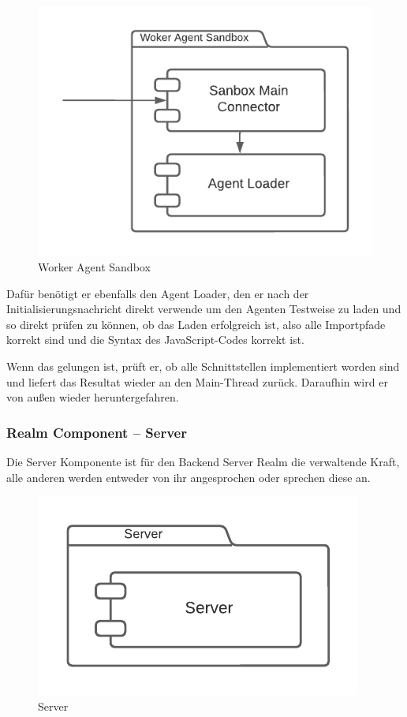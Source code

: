 \begin{figure}[htb]
    \centering
    \includegraphics[scale=.65,center]{medien/worker-agent-sandbox.pdf}
    \caption{Worker Agent Sandbox}
    \ownsource
    \label{fig:worker-agent-sandbox}
\end{figure}

\FloatBarrier

Dafür benötigt er ebenfalls den Agent Loader, den er nach der Initialisierungsnachricht direkt verwende um den Agenten Testweise zu laden und so direkt prüfen zu können, ob das Laden erfolgreich ist, also alle Importpfade korrekt sind und die Syntax des JavaScript-Codes korrekt ist.

Wenn das gelungen ist, prüft er, ob alle Schnittstellen implementiert worden sind und liefert das Resultat wieder an den Main-Thread zurück.
Daraufhin wird er von außen wieder heruntergefahren.

\subsubsection{Realm Component – Server}

Die Server Komponente ist für den Backend Server Realm die verwaltende Kraft, alle anderen werden entweder von ihr angesprochen oder sprechen diese an.

\begin{figure}[htb]
    \centering
    \includegraphics[scale=.65,center]{medien/server.pdf}
    \caption{Server}
    \ownsource
    \label{fig:server}
\end{figure}

